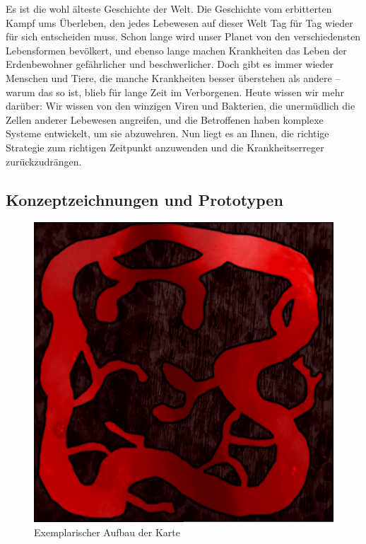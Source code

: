 
Es ist die wohl älteste Geschichte der Welt. Die Geschichte vom erbitterten
Kampf ums Überleben, den jedes Lebewesen auf dieser Welt Tag für Tag wieder für
sich entscheiden muss. Schon lange wird unser Planet von den verschiedensten
Lebensformen bevölkert, und ebenso lange machen Krankheiten das Leben der
Erdenbewohner gefährlicher und beschwerlicher. Doch gibt es immer wieder
Menschen und Tiere, die manche Krankheiten besser überstehen als andere --
warum das so ist, blieb für lange Zeit im Verborgenen. Heute wissen wir mehr
darüber: Wir wissen von den winzigen Viren und Bakterien, die unermüdlich die
Zellen anderer Lebewesen angreifen, und die Betroffenen haben komplexe Systeme
entwickelt, um sie abzuwehren. Nun liegt es an Ihnen, die richtige Strategie
zum richtigen Zeitpunkt anzuwenden und die Krankheitserreger zurückzudrängen.

\subsection{Konzeptzeichnungen und Prototypen}
\begin{figure}[ht]
  \begin{center}
    \includegraphics[width=12cm]{./img_screenplay/map_small}
  \end{center}
  \caption{Exemplarischer Aufbau der Karte}
  \label{fig:karte}
\end{figure}

